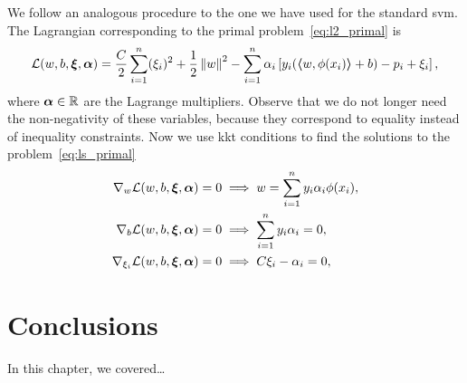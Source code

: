 We follow an analogous procedure to the one we have used for the standard \acrshort{svm}. The Lagrangian corresponding to the primal problem~\eqref{eq:l2_primal} is 
\begin{equation}
    \label{eq:ls_lagr}
    \lagr(w, b, \fv{\xi}, \fv{\alpha}) = \frac{C}{2} \sum_{i=1}^\nsamples (\xi_i)^2 + \frac{1}{2} \norm{w}^2 - \sum_{i=1}^\nsamples \alpha_i \left[ y_i (\dotp{w}{\phi(x_i)} + b) - p_i + \xi_i \right] ,
\end{equation}
%
where $\bm{\alpha} \in \mathbb{R}$ are the Lagrange multipliers. Observe that we do not longer need the non-negativity of these variables, because they correspond to equality instead of inequality constraints.
%
Now we use \acrshort{kkt} conditions to find the solutions to the problem~\eqref{eq:ls_primal}
\begin{align}
    \nabla_w \lagr(w, b, \fv{\xi}, \fv{\alpha}) = 0 &\implies w = \sum_{i=1}^\nsamples y_i \alpha_i \phi(x_i) , \label{eq:lagr_diff_w_l2} \\
    \nabla_b \lagr(w, b, \fv{\xi}, \fv{\alpha}) = 0 &\implies \sum_{i=1}^\nsamples y_i \alpha_i = 0, \label{eq:lagr_diff_b_l2} \\
    \nabla_{\xi_i} \lagr(w, b, \fv{\xi}, \fv{\alpha}) = 0 &\implies C \xi_i - \alpha_i  = 0 , \label{eq:lagr_diff_xi_l2}
\end{align}


\section{Conclusions}\label{sec-conclusions-1}

In this chapter, we covered\dots
